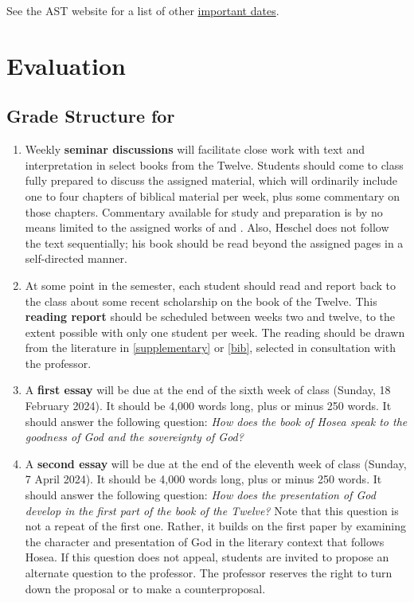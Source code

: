 \documentclass[titlepage]{article}
\begin{document}
See the AST website for a list of other \href{http://www.astheology.ns.ca/students/academic-dates.html}{important dates}.

\section{Evaluation}
\label{evaluation}

\subsection{Grade Structure for \ccode}
\label{structure}

\begin{enumerate}

	\item Weekly \textbf{seminar discussions} will facilitate close work
	with text and interpretation in select books from the Twelve.
	Students should come to class fully prepared to discuss the assigned
	material, which will ordinarily include one to four chapters of
	biblical material per week, plus some commentary on those chapters.
	Commentary available for study and preparation is by no means
	limited to the assigned works of \cite{Theodoret} and
	\cite{Heschel}. Also, Heschel does not follow the text sequentially;
	his book should be read beyond the assigned pages in a self-directed
	manner.

	\item At some point in the semester, each student should read and
	report back to the class about some recent scholarship on the book
	of the Twelve. This \textbf{reading report} should be scheduled
	between weeks two and twelve, to the extent possible with only one
	student per week. The reading should be drawn from the literature in
	\autoref{supplementary} or \autoref{bib}, selected in consultation
	with the professor.

	\item A \textbf{first essay} will be due at the end of the sixth
	week of class (Sunday, 18 February 2024). It should be 4,000 words
	long, plus or minus 250 words. It should answer the following
	question: \emph{How does the book of Hosea speak to the goodness of
	God and the sovereignty of God?}

	\item A \textbf{second essay} will be due at the end of the eleventh
	week of class (Sunday, 7 April 2024). It should be 4,000 words long,
	plus or minus 250 words. It should answer the following question:
	\emph{How does the presentation of God develop in the first part of
	the book of the Twelve?} Note that this question is not a repeat of
	the first one. Rather, it builds on the first paper by examining the
	character and presentation of God in the literary context that
	follows Hosea. If this question does not appeal, students are
	invited to propose an alternate question to the professor. The
	professor reserves the right to turn down the proposal or to make a
	counterproposal.
	
\end{enumerate}
\end{document}
